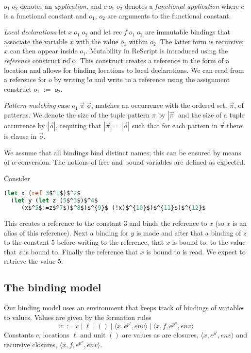 \documentclass{llncs}
\begin{document}
$o_1\;o_2$ denotes an \emph{application}, and $c\;o_1\;o_2$ denotes a \emph{functional application}
where $c$ is a functional constant and $o_1$, $o_2$ are arguments to the functional constant.

\emph{Local declarations} $\mbox{let} \; x \; o_1 \; o_2$ and
$\mbox{let rec} \; f \; o_1 \; o_2$ are immutable bindings that
associate the variable $x$ with the value $o_1$ within $o_2$. The latter
form is recursive; $x$ can then appear inside $o_1$. Mutability
in ReScript is introduced using the \emph{reference} construct
$\mbox{ref\;o}$. This construct creates a reference in the form of a
location and allows for binding locations to local declarations. We
can read from a reference for $o$ by writing $!o$ and write to a
reference using the assignment construct $o_1\;:=\;o_2$. 

\emph{Pattern matching} $\mbox{case} \; o_1 \; \vec{\pi} \; \vec{o}$,
matches an occurrence with the ordered set, $\vec{\pi}$, of patterns.
We denote the size of the tuple pattern $\pi$ by $|\vec{\pi}|$ and the
size of a tuple occurrence by $|\vec{o}|$, requiring that
$|\vec{\pi}| = |\vec{o}|$ such that for each pattern in $\vec{\pi}$
there is clause in $\vec{o}$.

We assume that all bindings bind distinct names; this can be ensured
by means of $\alpha$-conversion. The notions of free and bound
variables are defined as expected. 

\begin{example}\label{ex:write}
Consider
\begin{lstlisting}[language=Caml, mathescape=true]
  (let x (ref 3$^1$)$^2$
  (let y (let z (5$^3$)$^4$
     (x$^5$:=z$^7$)$^8$)$^{9}$ (!x)$^{10}$)$^{11}$)$^{12}$
\end{lstlisting}
This creates a reference to the constant 3 and binds the reference to
$x$ (so $x$ is an alias of this reference). Next a binding for $y$ is
made and after that a binding of $z$ to the constant 5 before writing
to the reference, that $x$ is bound to, to the value that $z$ is bound
to.  Finally the reference that $x$ is bound to is read. We expect to
retrieve the value $5$.
\end{example}

\subsection{The binding model}\label{sec:EnvSto}

Our binding model uses an environment that keeps
track of bindings of variables to values. Values are given by the formation rules
%
\[ v ::= c \mid \ell \mid () \mid \langle x,e^{p'},env\rangle \mid \langle
  x,f,e^{p''},env\rangle \]
%
Constants $c$, locations $\ell$ and unit $()$ are values as are closures, $\langle
x,e^{p'},env\rangle$ and recursive closures, $\langle x,f,e^{p''},env\rangle$.
\end{document}
